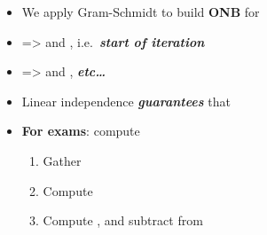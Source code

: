 \begin{itemize}
            \begin{itemize}

                  \item
                        We apply Gram-Schmidt to build \textbf{ONB}
                        for 
                  \item
                         =>
                         and
                        ,
                        i.e.~\textbf{\emph{start of iteration}}
                  \item
                         =>
                        and ,
                        \textbf{\emph{etc\ldots{}}}
                  \item
                        Linear independence \textbf{\emph{guarantees}} that
                  \item
                        \textbf{For exams}: compute 

                        \begin{enumerate}
                              \item
                                    Gather
                              \item
                                    Compute
                              \item
                                    Compute , and
                                    subtract from 
                        \end{enumerate}
            \end{itemize}
\end{itemize}

